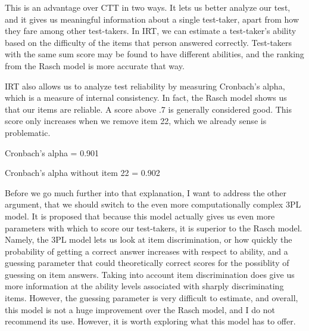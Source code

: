 \documentclass{article}\usepackage[]{graphicx}\usepackage[]{color}
\newenvironment{knitrout}{}{} %
\begin{document}
\begin{enumerate}
\begin{knitrout}
{}



\end{knitrout}
\raggedright
This is an advantage over CTT in two ways. It lets us better analyze our test, and it gives us meaningful information about a single test-taker, apart from how they fare among other test-takers. In IRT, we can estimate a test-taker's ability based on the difficulty of the items that person answered correctly. Test-takers with the same sum score may be found to have different abilities, and the ranking from the Rasch model is more accurate that way. 

IRT also allows us to analyze test reliability by measuring Cronbach's alpha, which is a measure of internal consistency. In fact, the Rasch model shows us that our items are reliable. A score above .7 is generally considered good. This score only increases when we remove item 22, which we already sense is problematic.

\centering

\raggedright
Cronbach's alpha = 0.901 %

Cronbach's alpha without item 22 = 0.902
\raggedright

Before we go much further into that explanation, I want to address the other argument, that we should switch to the even more computationally complex 3PL model. It is proposed that because this model actually gives us even more parameters with which to score our test-takers, it is superior to the Rasch model. Namely, the 3PL model lets us look at item discrimination, or how quickly the probability of getting a correct answer increases with respect to ability, and a guessing parameter that could theoretically correct scores for the possiblity of guessing on item answers. Taking into account item discrimination does give us more information at the ability levels associated with sharply discriminating items. However, the guessing parameter is very difficult to estimate, and overall, this model is not a huge improvement over the Rasch model, and I do not recommend its use. However, it is worth exploring what this model has to offer.


\end{enumerate}
\end{document}
